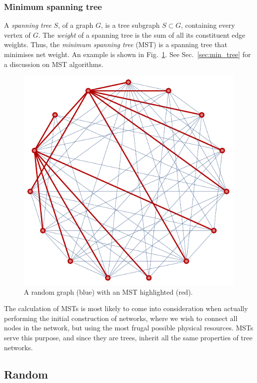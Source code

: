\documentclass[aps,rmp,twocolumn,amsmath,amssymb,nofootinbib,superscriptaddress,longbibliography,floatfix,table-of-contents,eqsecnum]{revtex4-1}
\begin{document}
%
%

\subsubsection{Minimum spanning tree} \label{sec:graph_MST} 

A \textit{spanning tree} $S$, of a graph $G$, is a tree subgraph \mbox{$S\subset G$}, containing every vertex of $G$. The \textit{weight} of a spanning tree is the sum of all its constituent edge weights. Thus, the \textit{minimum spanning tree} (MST) is a spanning tree that minimises net weight. An example is shown in Fig.~\ref{fig:mst}. See Sec.~\ref{sec:min_tree} for a discussion on MST algorithms.

\begin{figure}[!htb]
\includegraphics[width=0.8\columnwidth]{mst}
\caption{A random graph (blue) with an MST highlighted (red).} \label{fig:mst}
\end{figure}

The calculation of MSTs is most likely to come into consideration when actually performing the initial construction of networks, where we wish to connect all nodes in the network, but using the most frugal possible physical resources. MSTs serve this purpose, and since they are trees, inherit all the same properties of tree networks.

%
%

\subsection{Random} 
\end{document}
